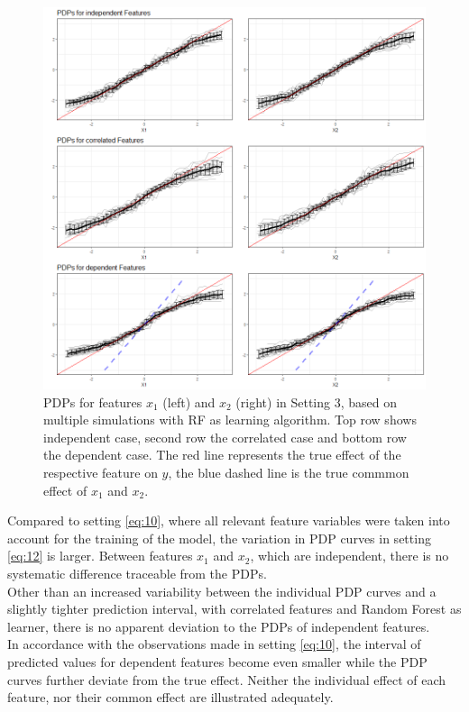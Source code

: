 \documentclass[]{krantz}
\begin{document}
\begin{figure}

\includegraphics[width=1\linewidth]{images/VK_PDP_20_Set3_RF} \hfill{}

\caption{PDPs for features $x_1$ (left) and $x_2$  (right) in Setting 3, based on multiple simulations with RF as learning algorithm. Top row shows independent case, second row the correlated case and bottom row the dependent case. The red line represents the true effect of the respective feature on $y$, the blue dashed line is the true commmon effect of $x_1$ and $x_2$.}\label{fig:Figure20}
\end{figure}

Compared to setting \eqref{eq:10}, where all relevant feature variables
were taken into account for the training of the model, the variation in
PDP curves in setting \eqref{eq:12} is larger. Between features \(x_1\)
and \(x_2\), which are independent, there is no systematic difference
traceable from the PDPs.\\
Other than an increased variability between the individual PDP curves
and a slightly tighter prediction interval, with correlated features and
Random Forest as learner, there is no apparent deviation to the PDPs of
independent features.\\
In accordance with the observations made in setting \eqref{eq:10}, the
interval of predicted values for dependent features become even smaller
while the PDP curves further deviate from the true effect. Neither the
individual effect of each feature, nor their common effect are
illustrated adequately.
\end{document}
